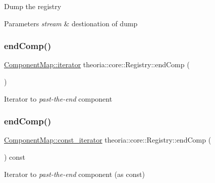 Dump the registry 
\begin{DoxyParams}{Parameters}
{\em stream} & destionation of dump \\
\hline
\end{DoxyParams}
\mbox{\label{classtheoria_1_1core_1_1Registry_a66ed200d29e49b9eb762a29f580c102a}} 
\subsubsection{\texorpdfstring{end\+Comp()}{endComp()}\hspace{0.1cm}{\footnotesize\ttfamily [1/2]}}
{\footnotesize\ttfamily \hyperlink{classtheoria_1_1util_1_1densemap_a4ee170442110252d3033534246f9677f}{Component\+Map\+::iterator} theoria\+::core\+::\+Registry\+::end\+Comp (\begin{DoxyParamCaption}{ }\end{DoxyParamCaption})}

Iterator to {\itshape past-\/the-\/end} component \mbox{\label{classtheoria_1_1core_1_1Registry_a27b24a7a567677cb23aef0d3510b0a20}} 
\subsubsection{\texorpdfstring{end\+Comp()}{endComp()}\hspace{0.1cm}{\footnotesize\ttfamily [2/2]}}
{\footnotesize\ttfamily \hyperlink{classtheoria_1_1util_1_1densemap_a8c2937f8e4ba47abf344d9f9f23f0c88}{Component\+Map\+::const\+\_\+iterator} theoria\+::core\+::\+Registry\+::end\+Comp (\begin{DoxyParamCaption}{ }\end{DoxyParamCaption}) const}

Iterator to {\itshape past-\/the-\/end} component (as const) \mbox{\label{classtheoria_1_1core_1_1Registry_ac88948c696663ae6f7ba3ece5c2fdcc9}} 
